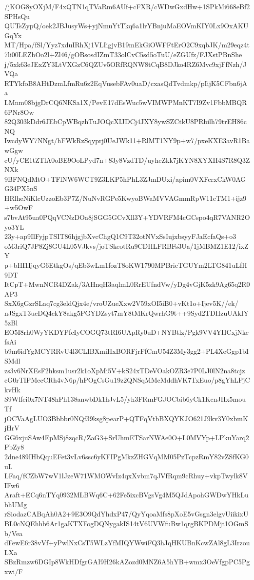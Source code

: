 /jKOG8yOXjM/F4xQTN1qTVaRm6AUf+cFXR/cWDwGxdHw+1SPkMi668eBf2SPHsQu
QUTsZypQ/oek2JBJusyWs+yjNmuYtTkq6a1lrYBnjuMaEOVmKIY0Lx9OxAKUGqYx
MT/Hpa/fSl/Yyz7xduIRhXj1VLIigjvB19mEkGiOWFFtErO2C9xqbJK/m29eqz4t
7li00LEZbOo2l+Zl46/gOBsosdIZmT33olCvC5sd5oTuU/eZGUfz/FJXstPBnShe
j/5xk63eJExZY3LtVXGzC6QZUv5ORfRQNW8tCqB8DJko4RZ6Mvc9xjFfNzh/JVQa
RTYkfoB8AHtDzmLfmRu6z2EqVusebFAv0uaD/cxasQdTvdmkp/pIijK5CFbn6jAa
LMnm08bjgDrCQ6NKSa1X/PevE17dEsWuc5wVIMWPMnKT7I9Zv1FbbMBQR6PNr8Ow
82Q303kDdr6JEbCpWBqzhTuJOQcXIJDCj4JXY8ywSZCtkU8PRbilh79trEH86cNQ
IwcdyWY7NNgt/hFWkRzSqyprj0UeJWk11+RlMT1NY9p+w7/pxeKXE3avR1BawGgw
cU/yCE1tZTlA0oBE9OoLPyd7n+83y8VzdTD/uyhcZkk7jKYN8XYXH4S7R8Q3ZNXk
9BFNQdMtO+TFlNW6WCT9Z3LKP5hPhL3ZJmDUxi/apim0VXFcrxCkW0AGG34PX5nS
HRlheNiKlcUzzoEb3P7Z/NuNvRGPe5KwyoBWaMVVAGmmRpW11cTM1+ijz9+w5OwF
s7bvAt95ua0PQqVCNzDOa8jSGG5GCvXll3Y+YDVRFM4cGCspo4qR7VANR2Oyo3YL
23y+ap9IlFyjpTSIT86hjgjbXvcChgQ1C9T32otNVxSsIujxbsyyFJaEcfaQs+o3
oM3riQ7JP8Zj8GU4L05VJkvs/joTSkeotRu9CDHLFRBFs3Ua/1jMBMZ1E12/ixZY
p+bHI1IjqyG6EtkgOs/qEb3wLm1fozT8oKW1790MPBricTGUYm2LTG841uLfH9DT
ItCpT+MwnNCR4DZak/3AHnqH3aqlmL0RrEUfndVw/yDg4vGjK5zk9Ag65q2R0AP3
SxX6gGzrSLaq7cg3eldQjx4e/vroUZueXxw2V59xOI5iB0+vKt1o+Ijev5K//ek/
nJSgxT3ucDQ4ckY8akg5PGYDZsyt7mY8tMKrQwrhG9t++9Syd2TDHzuUAkIY5zBl
EO5I8rh0WyYKDYPfcIyCOGQ73tRI6UApRy0uD+NYBtlz/Pgk9VV4YHCxjNkefsAi
b9m6idYgMCYRRvU4l3CLIBXmiHxBORFjrFfCmU54Z3My3gg2+PL4XeGgp1bISMdl
zs3v6NrXEsF2hksm1usr2k1oXpMi5V+kS24xTDeVOakOZR3e7P0LJ0lN2na8tcjz
cG0rTIPMecCRh4vN6p/hPOgCsGu19z2QNSqMMcMddhVK7TxEuo/p8gYhLPjCkvHk
S9Wlfei0x7NT48hPh138anwbDk1hJvL5/yh3FRmFGJOCbib6yCk1KcnJHx5mouTf
jOCVaAgLUO3Bbbbr0NQf39ksg8pearP+QTFqVtbBXQYKJO621J9kv3Y0xbmKjHrV
GG6xjuSAw4EpMSj8zqcR/ZaG3+SrUhmETSarNWAe0O+L0MVYp+LPkuYarq2PbZy8
2dne489IHbQquEFet3vLv6ssc6yKFIPgMkzZHGVqMM05PzTcpzRmY82vZSfKG0uL
LFaq/fCZbW7wV1lJzeW71WMOWvIz4qxXvbm7qJVfRqm9cRhuy+vkpTwylk8VIFw6
Araft+ECq6nTYq0932MLBWq6C+62Fe5ixcBVgsVg4M5QJdApohGWDwYHkLubhUMg
rSiodazCABqAh0A2+9E3O9QdYhdxP47/QyYqoaMfs8pXoE5vGsgn3elgvUiikixU
BL0cNQEhhb6Ar1gaKTXFogDQNygakIS14tV6UVWfuBw1qrgBKPDMjt1OGmSb/Vea
dFewE6r38vVf+yPwlNxCsT5WLzYfMIQYWwiFQ3hJqHKUBnKcwZAl8gL3IrzouLXa
SBzRmzw6DGIp8WkHDfgrGAI9H26kAZozd0MNZ6A5hYB+wmx3OeVfgpPC5Pgxwi/F
